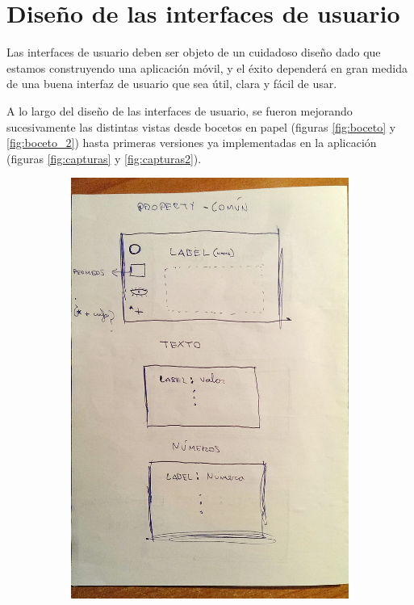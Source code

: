 \bigskip
\section{Diseño de las interfaces de usuario}

Las interfaces de usuario deben ser objeto de un cuidadoso diseño dado que estamos construyendo una aplicación móvil, y el éxito dependerá en gran medida de una buena interfaz de usuario que sea útil, clara y fácil de usar.

\bigskip
A lo largo del diseño de las interfaces de usuario, se fueron mejorando sucesivamente las distintas vistas desde bocetos en papel (figuras \ref{fig:boceto} y \ref{fig:boceto_2}) hasta primeras versiones ya implementadas en la aplicación (figuras \ref{fig:capturas} y \ref{fig:capturas2}).


\begin{figure}
    \centering
    \begin{subfigure}[]{0.4\textwidth}
        \includegraphics[width=\textwidth]{../images/boceto.jpg}

\end{subfigure}
\end{figure}

